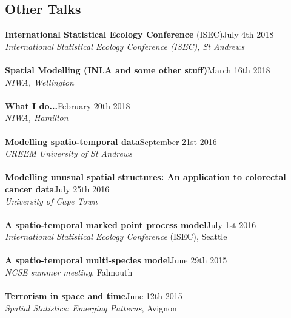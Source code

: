 \documentclass[10pt,letter]{res}
\begin{document}
\begin{resume}

\section{Other Talks}
\vspace{1mm}
{\textbf{International Statistical Ecology Conference} (ISEC)}\hfill July 4th 2018\\
 {\sl International Statistical Ecology Conference (ISEC), St Andrews}\\
\hdashrule[0.5ex]{4cm}{1pt}{1pt}\\
{\textbf{Spatial Modelling (INLA and some other stuff)}}\hfill March 16th 2018\\
 {\sl NIWA, Wellington}\\
\hdashrule[0.5ex]{4cm}{1pt}{1pt}\\
{\textbf{What I do...}}\hfill February 20th 2018\\
 {\sl NIWA, Hamilton}\\
\hdashrule[0.5ex]{4cm}{1pt}{1pt}\\
{\textbf{Modelling spatio-temporal data}}\hfill September 21st 2016\\
 {\sl CREEM University of St Andrews}\\
\hdashrule[0.5ex]{4cm}{1pt}{1pt}\\
{\textbf{Modelling unusual spatial structures: An application to colorectal cancer data}}\hfill July 25th 2016\\
 {\sl University of Cape Town}\\
\hdashrule[0.5ex]{4cm}{1pt}{1pt}\\
{\textbf{A spatio-temporal marked point process model}}\hfill July 1st 2016\\
 {\sl International Statistical Ecology Conference} (ISEC), Seattle\\
 \hdashrule[0.5ex]{4cm}{1pt}{1pt}\\
 {\textbf{A spatio-temporal multi-species model}}\hfill June 29th 2015\\
 {\sl NCSE summer meeting}, Falmouth\\
 \hdashrule[0.5ex]{4cm}{1pt}{1pt}\\
{\textbf{Terrorism in space and time}}\hfill June 12th 2015\\
 {\sl Spatial Statistics: Emerging Patterns}, Avignon\\
 \hdashrule[0.5ex]{4cm}{1pt}{1pt}\\

\end{resume}
\end{document}
